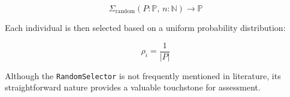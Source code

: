 \begin{definition}
  \begin{equation}
    \Sigma_{\mathrm{random}}(P: \mathbb{P},\, n: \mathbb{N}) \to \mathbb{P}
  \end{equation}

  Each individual is then selected based on a uniform probability distribution:

  \begin{equation}
    \rho_i = \frac{1}{|P|}
  \end{equation}
\end{definition}

Although the \texttt{RandomSelector} is not frequently mentioned in literature, its straightforward nature provides a 
valuable touchstone for assessment.
